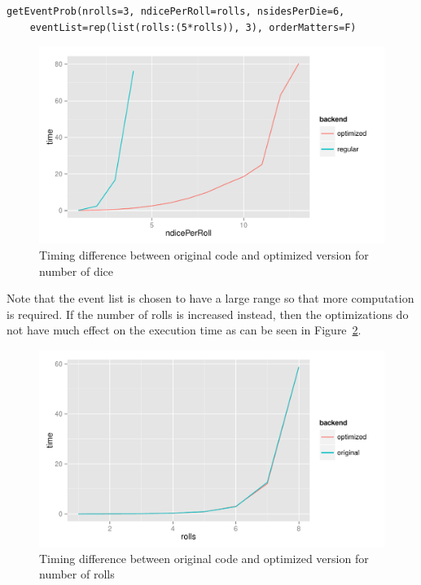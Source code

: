 \documentclass[12pt]{article}
\begin{document}
\begin{lstlisting}
getEventProb(nrolls=3, ndicePerRoll=rolls, nsidesPerDie=6,
	eventList=rep(list(rolls:(5*rolls)), 3), orderMatters=F)
\end{lstlisting}

\begin{figure}[h!]
	\centering
	\includegraphics[width=6in]{codeOptimizations.pdf}
	\caption{Timing difference between original code and optimized version for number of dice}
	\label{codeOptimizations}
\end{figure}

Note that the event list is chosen to have a large range so that more computation is required. If the number of rolls is increased instead, then the optimizations do not have much effect on the execution time as can be seen in Figure~\ref{codeOptimizationsRolls}.

\begin{figure}[h!]
	\centering
	\includegraphics[width=6in]{codeOptimizationsRolls.pdf}
	\caption{Timing difference between original code and optimized version for number of rolls}
	\label{codeOptimizationsRolls}
\end{figure}
\end{document}
